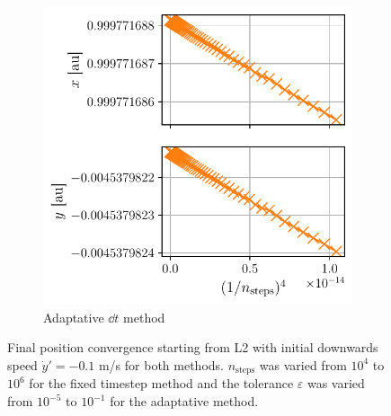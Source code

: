 \begin{figure}[h]
\begin{subfigure}{0.49\linewidth}
        \includegraphics[width=\linewidth]{figures/lagrange_convergence_adapt.pdf}
        \caption{Adaptative \(\dd t\) method}
        \label{fig:lagrange_conv_adapt}
    \end{subfigure}
    \caption{Final position convergence starting from L2 with initial downwards speed \(\dot y' = -0.1\) m/s for both methods. \(n_\textrm{steps}\) was varied from \(10^4\) to \(10^6\) for the fixed timestep method and the tolerance \(\varepsilon\) was varied from \(10^{-5}\) to \(10^{-1}\) for the adaptative method.}
    \label{fig:lagrange_conv}
\end{figure}

